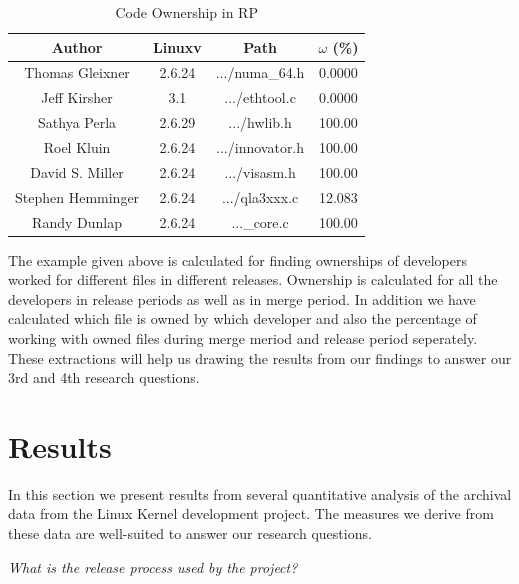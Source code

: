 \documentclass{acm_proc_article-sp}
\begin{document}
\begin{table}[ht]
\caption{Code Ownership in RP}  %
\centering 						%
\begin{tabular}{c c c c}				%
\hline\hline						%
Author 				& Linuxv		& Path				& $\omega$ (\%) \\ [0.5ex]
\hline 							%
Thomas Gleixner		& 2.6.24		& .../numa\_64.h	& 0.0000\\
Jeff Kirsher			& 3.1		& .../ethtool.c		& 0.0000\\
Sathya Perla			& 2.6.29		& .../hwlib.h		& 100.00\\
Roel Kluin			& 2.6.24		& .../innovator.h 	& 100.00\\
David S. Miller		& 2.6.24		& .../visasm.h 		& 100.00\\
Stephen Hemminger	& 2.6.24		& .../qla3xxx.c	 	& 12.083\\
Randy Dunlap			& 2.6.24		& ...\_core.c 		& 100.00\\
[1ex]							%
\hline 							%
\end{tabular}
\label{table:nonlin} 				%
\end{table}
The example given above is calculated for finding ownerships of developers worked for different files in different releases. Ownership is calculated for all the developers in release periods as well as in merge period. In addition we have calculated which file is owned by which developer and also the percentage of working with owned files during merge meriod and release period seperately. These extractions will help us drawing the results from our findings to answer our 3rd and 4th research questions.

\section{Results}
In this section we present results from several quantitative analysis of the archival data from the Linux Kernel development project. The measures we derive from these data are well-suited to answer our research questions.

\textit{What is the release process used by the project?}
\end{document}
